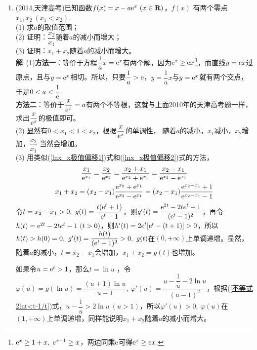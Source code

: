 \begin{enumerate}[label={【\textbf{例\thechapter.\arabic*}】},
 leftmargin=\inteval{\myenumleftmargin}pt,
 itemsep=\inteval{\myenumitempsep}pt,
 itemindent=\inteval{\myenumitemindent}pt]
\item (2014,天津高考)已知函数$ f(x)=x-a\e^{x}\ (x\in \textbf{R}) $，$ f(x) $
有两个零点$ x_1,x_2\ (x_1<x_2) $. \\
(1) 求$ a $的取值范围；\\
(2) 证明：$ \dfrac{x_2}{x_1} $随着$ a $的减小而增大；\\
(3) 证明：$ x_1+x_2 $随着$ a $的减小而增大。\\
\textbf{解}\ (1)\textbf{方法一}：等价于方程$ \dfrac{1}{a}x=\mathrm{e}^x $有两个解，因为$ \mathrm{e}^x\geq \mathrm{e} x $\footnote{\q $ \mathrm{e}^x\geq 1+x,\ \mathrm{e}^{x-1}\geq x $，两边同乘$ \mathrm{e} $可得$ \mathrm{e}^x\geq \mathrm{e} x $. }，而直线$ y=\mathrm{e} x $过原点，且与$ y=\mathrm{e}^x $相切。所以，只要$ \dfrac{1}{a}> \mathrm{e} $，$ y=\dfrac{1}{a}x $与$ y=\mathrm{e}^x $就有两个交点，于是$ 0<a<\dfrac{1}{\mathrm{e}} $. \\
\textbf{方法二}：等价于$ \dfrac{x}{\mathrm{e}^x}=a $有两个不等根，这就与上面2010年的天津高考题一样，求出$ \dfrac{x}{\mathrm{e}^x} $的极值即可。\\
(2) 显然有$ 0<x_1<1<x_2 $，根据$ \dfrac{x}{\mathrm{e}^x} $的单调性，
随着$ a $的减小，$ x_1 $减小，$ x_2 $增加，$ \dfrac{x_2}{x_1} $
当然会增加。\\
(3)  用类似(\ref{lnx_x极值偏移1})式和(\ref{lnx_x极值偏移2})式的方法，
\begin{gather*}
	\dfrac{x_1}{\mathrm{e}^{x_1}}=\dfrac{x_2}{\mathrm{e}^{x_2}}=
	\dfrac{x_2+x_1}{\mathrm{e}^{x_2}+\mathrm{e}^{x_1}}=
	\dfrac{x_2-x_1}{\mathrm{e}^{x_2}-\mathrm{e}^{x_1}} \\
	x_1+x_2=(x_2-x_1)\dfrac{\mathrm{e}^{x_2}+\mathrm{e}^{x_1}}{\mathrm{e}^{x_2}-\mathrm{e}^{x_1}} 
	=(x_2-x_1)\dfrac{\mathrm{e}^{x_2-x_1}+1}{\mathrm{e}^{x_2-x_1}-1}
\end{gather*}
令$ t=x_2-x_1>0,\ g(t)=\dfrac{t(\e^t+1)}{\e^t-1} $，则$ g'(t)=\dfrac{\mathrm{e}^{2t}-2te^t-1}{(\mathrm{e}^t-1)^2} $，再令$ h(t)=\mathrm{e}^{2t}-2te^t-1\ (t>0) $，则$ h'(t)=2e^t[\mathrm{e}^t-(t+1)]>0 $，所以$ h(t)>h(0)=0,\ g'(t)=\dfrac{h(t)}{(\e^t-1)^2}>0,\ g(t) $在$ (0,+\infty) $上单调递增。显然，随着$ a $的减小，$ t=x_2-x_1 $会增加，$ x_1+x_2=g(t) $也增加。

如果令$ u=\mathrm{e}^t>1 $，那么$ t=\ln u$ ，令$ \varphi(u)=g(\ln u)=\dfrac{(u+1)\ln u}{u-1},\ \varphi'(u)=\dfrac{u-\dfrac{1}{u}-2\ln u}{(u-1)^2} $，根据(\ref{不等式2lnt<t-1/t})式，$ u-\dfrac{1}{u}>2\ln u\ (u>1) $，所以$ \varphi'(u)>0,\ \varphi(u) $在$ (1,+\infty) $上单调递增，同样能说明$ x_1+x_2 $随着$ a $的减小而增大。


\end{enumerate}
